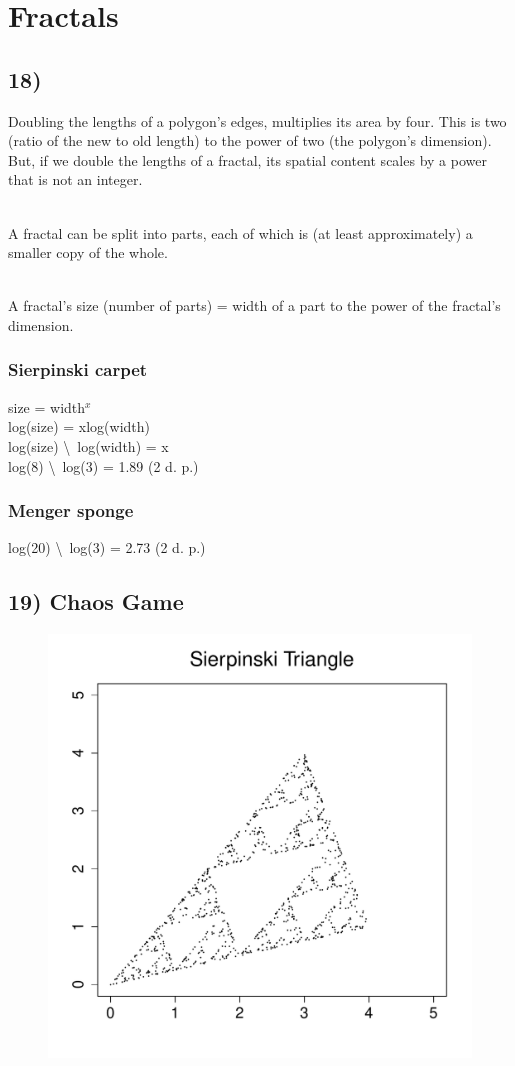 \documentclass[11pt]{article}
\begin{document}
\newpage

\section*{Fractals}

\subsection*{18)}
Doubling the lengths of a polygon's edges, multiplies its area by four. This is two (ratio of the new to old length) to the power of two (the polygon's dimension). But, if we double the lengths of a fractal, its spatial content scales by a power that is not an integer.

\noindent
\\
A fractal can be split into parts, each of which is (at least approximately) a smaller copy of the whole.

\noindent
\\
A fractal's size (number of parts) = width of a part to the power of the fractal's dimension.

\subsubsection*{Sierpinski carpet}
size = width$^{x}$\\
log(size) = xlog(width)\\
log(size) \textbackslash\ log(width) = x\\
log(8) \textbackslash\ log(3) = 1.89 (2 d. p.)

\subsubsection*{Menger sponge}
log(20) \textbackslash\ log(3) = 2.73 (2 d. p.)

\newpage

\subsection*{19) Chaos Game}
\begin{figure}[h]
\includegraphics[width=0.5\linewidth]{../Results/19_chaos_game.pdf}
\end{figure}
\end{document}
